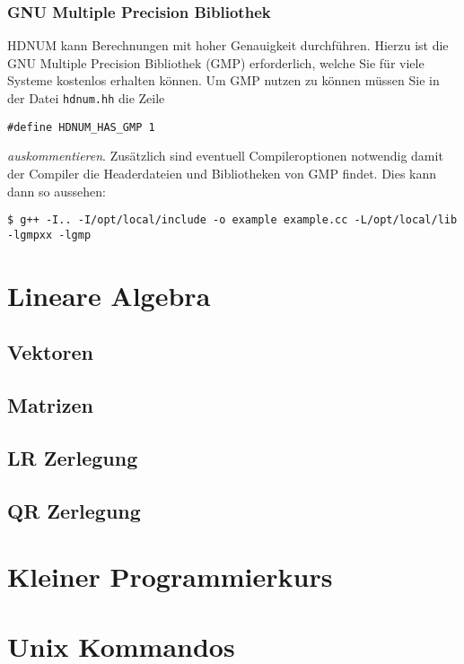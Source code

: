 \documentclass[a4paper,11pt]{article}
\theoremstyle{definition}
\begin{document}
\subsubsection*{GNU Multiple Precision Bibliothek}

HDNUM kann Berechnungen mit hoher Genauigkeit durchführen. Hierzu ist die GNU Multiple Precision
Bibliothek (GMP) erforderlich, 
welche Sie für viele Systeme kostenlos erhalten können. Um GMP nutzen zu können müssen 
Sie in der Datei \lstinline{hdnum.hh} die Zeile
\begin{lstlisting}[basicstyle=\ttfamily\small,frame=single]
#define HDNUM_HAS_GMP 1
\end{lstlisting}
\textit{auskommentieren}. Zusätzlich sind eventuell Compileroptionen notwendig damit der Compiler
die Headerdateien und Bibliotheken von GMP findet. Dies kann dann so aussehen:
\begin{lstlisting}[basicstyle=\ttfamily\footnotesize,frame=single]
$ g++ -I.. -I/opt/local/include -o example example.cc -L/opt/local/lib -lgmpxx -lgmp
\end{lstlisting}

\section{Lineare Algebra}

\subsection{Vektoren}

\subsection{Matrizen}

\subsection{LR Zerlegung}

\subsection{QR Zerlegung}

\begin{appendices}

\section{Kleiner Programmierkurs}

\section{Unix Kommandos}

\end{appendices}



 
\end{document}
